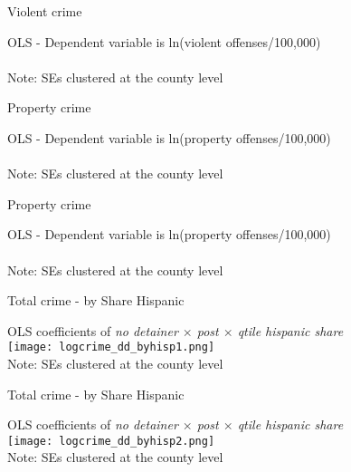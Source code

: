 \documentclass[xcolor=pdftex,dvipsnames,table]{beamer}
\newcommand{\tablesfolder}{/Users/bbiasi/Dropbox/Research/sanctuaries/sanctuaries_git/tex/tables}
\begin{document}
\begin{frame}{Violent crime}
\footnotesize
\begin{center}
OLS - Dependent variable is ln(violent offenses/100,000)\\

\\\footnotesize{Note: SEs clustered at the county level}
\end{center}
\end{frame}

\begin{frame}{Property crime}
\footnotesize
\begin{center}
OLS - Dependent variable is ln(property offenses/100,000)\\

\\\footnotesize{Note: SEs clustered at the county level}
\end{center}
\end{frame}

\begin{frame}{Property crime}
\footnotesize
\begin{center}
OLS - Dependent variable is ln(property offenses/100,000)\\

\\\footnotesize{Note: SEs clustered at the county level}
\end{center}
\end{frame}
%
%
\begin{frame}{Total crime - by Share Hispanic}
\footnotesize
\begin{center}
OLS coefficients of \textit{no detainer $\times$ post $\times$ qtile hispanic share}\\
\texttt{[image: logcrime\_dd\_byhisp1.png]}\\
\footnotesize{Note: SEs clustered at the county level}
\end{center}
\end{frame}

\begin{frame}{Total crime - by Share Hispanic}
\footnotesize
\begin{center}
OLS coefficients of \textit{no detainer $\times$ post $\times$ qtile hispanic share}\\
\texttt{[image: logcrime\_dd\_byhisp2.png]}\\
\footnotesize{Note: SEs clustered at the county level}
\end{center}
\end{frame}
\end{document}
